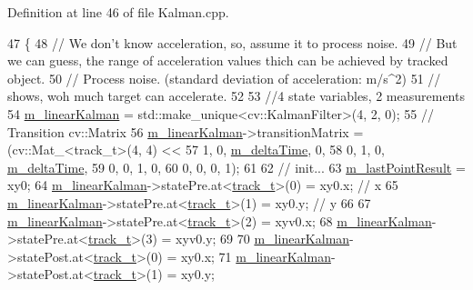 Definition at line 46 of file Kalman.\+cpp.


\begin{DoxyCode}
47 \{
48     \textcolor{comment}{// We don't know acceleration, so, assume it to process noise.}
49     \textcolor{comment}{// But we can guess, the range of acceleration values thich can be achieved by tracked object.}
50     \textcolor{comment}{// Process noise. (standard deviation of acceleration: m/s^2)}
51     \textcolor{comment}{// shows, woh much target can accelerate.}
52 
53     \textcolor{comment}{//4 state variables, 2 measurements}
54     \mbox{\hyperlink{class_t_kalman_filter_aec607aacb57ef1f78e514c6b3ef18435}{m\_linearKalman}} = std::make\_unique<cv::KalmanFilter>(4, 2, 0);
55     \textcolor{comment}{// Transition cv::Matrix}
56     \mbox{\hyperlink{class_t_kalman_filter_aec607aacb57ef1f78e514c6b3ef18435}{m\_linearKalman}}->transitionMatrix = (cv::Mat\_<track\_t>(4, 4) <<
57                                         1, 0, \mbox{\hyperlink{class_t_kalman_filter_a7335e3bd7a695ebaf5eaa93c42e39eae}{m\_deltaTime}}, 0,
58                                         0, 1, 0, \mbox{\hyperlink{class_t_kalman_filter_a7335e3bd7a695ebaf5eaa93c42e39eae}{m\_deltaTime}},
59                                         0, 0, 1, 0,
60                                         0, 0, 0, 1);
61 
62     \textcolor{comment}{// init...}
63     \mbox{\hyperlink{class_t_kalman_filter_a91efb6a00cfae5df3e513ceba2239fa3}{m\_lastPointResult}} = xy0;
64     \mbox{\hyperlink{class_t_kalman_filter_aec607aacb57ef1f78e514c6b3ef18435}{m\_linearKalman}}->statePre.at<\mbox{\hyperlink{defines_8h_a7ce9c8817b42ab418e61756f579549ab}{track\_t}}>(0) = xy0.x; \textcolor{comment}{// x}
65     \mbox{\hyperlink{class_t_kalman_filter_aec607aacb57ef1f78e514c6b3ef18435}{m\_linearKalman}}->statePre.at<\mbox{\hyperlink{defines_8h_a7ce9c8817b42ab418e61756f579549ab}{track\_t}}>(1) = xy0.y; \textcolor{comment}{// y}
66 
67     \mbox{\hyperlink{class_t_kalman_filter_aec607aacb57ef1f78e514c6b3ef18435}{m\_linearKalman}}->statePre.at<\mbox{\hyperlink{defines_8h_a7ce9c8817b42ab418e61756f579549ab}{track\_t}}>(2) = xyv0.x;
68     \mbox{\hyperlink{class_t_kalman_filter_aec607aacb57ef1f78e514c6b3ef18435}{m\_linearKalman}}->statePre.at<\mbox{\hyperlink{defines_8h_a7ce9c8817b42ab418e61756f579549ab}{track\_t}}>(3) = xyv0.y;
69 
70     \mbox{\hyperlink{class_t_kalman_filter_aec607aacb57ef1f78e514c6b3ef18435}{m\_linearKalman}}->statePost.at<\mbox{\hyperlink{defines_8h_a7ce9c8817b42ab418e61756f579549ab}{track\_t}}>(0) = xy0.x;
71     \mbox{\hyperlink{class_t_kalman_filter_aec607aacb57ef1f78e514c6b3ef18435}{m\_linearKalman}}->statePost.at<\mbox{\hyperlink{defines_8h_a7ce9c8817b42ab418e61756f579549ab}{track\_t}}>(1) = xy0.y;

\end{DoxyCode}
